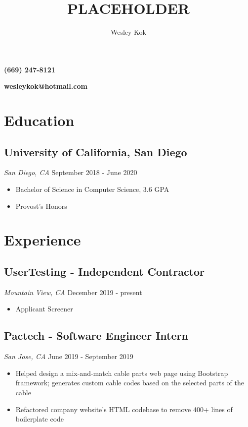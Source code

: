 \documentclass{article}
\makeatletter
\renewcommand{\maketitle}{
\noindent
{\huge\bf\theauthor} 

\vspace{-1em}\hfill{\large\bf (669) 247-8121}

{\Huge \href{https://github.com/WKhiro}{\faGithub} \href{https://www.linkedin.com/in/wesley-kok/}{\color{Aquamarine}\faLinkedin}}

\vspace{-1.5em} \hfill {\large \bf wesleykok@hotmail.com}

}
\makeatother
\begin{document}
\title{PLACEHOLDER}
\author{Wesley Kok}

\maketitle
\thispagestyle{empty} %

\section{Education}
\subsection{University of California, San Diego} {\it \quad San Diego, CA} \hfill September 2018 - June 2020
\begin{itemize}
\item Bachelor of Science in Computer Science, 3.6 GPA
\item Provost's Honors
\end{itemize}
\section{Experience}
\subsection{UserTesting - Independent Contractor} {\it \quad Mountain View, CA} \hfill December 2019 - present
\begin{itemize}
\item Applicant Screener
\end{itemize}

\subsection{Pactech - Software Engineer Intern} {\it \quad San Jose, CA} \hfill June 2019 - September 2019
\begin{itemize}
\item Helped design a mix-and-match cable parts web page using Bootstrap framework; generates custom cable codes based on the selected parts of the cable
\item Refactored company website's HTML codebase to remove 400+ lines of boilerplate code
\end{itemize}
\end{document}
